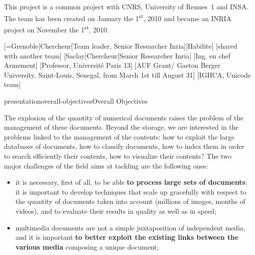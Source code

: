 \documentclass{ra2015}
\begin{document}
\maketitle


\begin{moreinfo}
  This project is a common project with CNRS, University of Rennes~1 and INSA. The
  team has been created on January the 1\textsuperscript{st}, 2010 and became an
  INRIA project on November the 1\textsuperscript{st}, 2010.
\end{moreinfo}

\begin{composition}

       [=Grenoble]{Chercheur}[Team leader, Senior Researcher Inria][Habilite]
       [shared with another team]
       [Saclay]{Chercheur}[Senior Researcher Inria]
       [Ing. en chef Armement]
       [Professor, Université Paris 13]
       [AUF Grant/ Gaston Berger University, Saint-Louis, Senegal, from March 1st till August 31]
       [IGHCA, Unicode team]
\end{composition}

\begin{module}{presentation}{overall-objectives}{Overall Objectives}

  The explosion of the quantity of numerical documents raises the problem
  of the management of these documents. Beyond the storage,
  we are interested in the problems linked to the management of the contents: 
  how to exploit the large databases of documents, how to classify documents, how to
  index them in order to search efficiently their contents, how to visualize
  their contents? 
  The two major challenges of the field  aims at tackling are the following ones:
  \begin{itemize} 
  \item it is necessary, first of all, to be able {\bf to
      process large sets of documents}: it is important to develop techniques
    that scale up gracefully with respect to the quantity of documents
    taken into account (millions of images, months of videos), and to evaluate
    their results in quality as well as in speed;
    
  \item  multimedia documents are not a simple juxtaposition of
    independent media, and it is important {\bf to better exploit the
      existing links between the various media} composing a unique
    document;
  \end{itemize}
\end{module}
\end{document}
